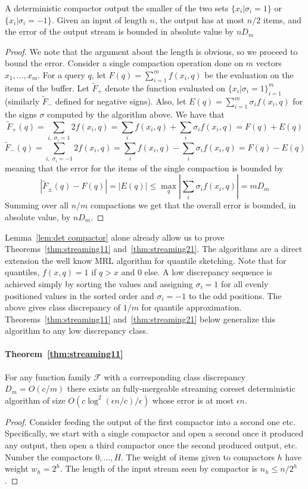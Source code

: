 \documentclass[12pt]{colt2019} %
\newcommand{\eps}{\epsilon}
\newcommand{\F}{\mathcal{F}}
\begin{document}
{\begin{lemma} \label{lem:det compactor}
A deterministic compactor output the smaller of the two sets  $\{ x_i | \sigma_i = 1\}$ or  $\{ x_i | \sigma_i = -1\}$. Given an input of length $n$, the output has at most $n/2$ items, and the error of the output stream is bounded in absolute value by $nD_m$
\end{lemma}
\begin{proof}
We note that the argument about the length is obvious, so we proceed to bound the error. Consider a single compaction operation done on $m$ vectors $x_1,\ldots,x_m$. For a query $q$, let $F(q)=\sum_{i=1}^m f(x_i,q)$ be the evaluation on the items of the buffer. Let $\tilde F_{+}$ denote the function evaluated on $\{ x_i | \sigma_i = 1\}_{i=1}^m$ (similarly $\tilde F_{-}$ defined for negative signs). Also, let $E(q) = \sum_{i=1}^m \sigma_i f(x_i,q)$ for the signs $\sigma$ computed by the algorithm above. We have that 
$$\tilde F_{+}(q) = \sum_{i ,\; \sigma_i=1} 2f(x_i, q) = \sum_{i} f(x_i, q) +  \sum_{i} \sigma_i f(x_i, q) = F(q) + E(q)$$
$$\tilde F_{-}(q) = \sum_{i ,\; \sigma_i=-1} 2f(x_i, q) = \sum_{i} f(x_i, q) - \sum_{i} \sigma_i f(x_i, q) = F(q) - E(q)$$
meaning that the error for the items of the single compaction is bounded by
$$|\tilde F_{\pm}(q) - F(q)| = |E(q)| \le \max_q |\sum_i \sigma_i f(x_i,q)| = mD_m$$
Summing over all $n/m$ compactions we get that the overall error is bounded, in absolute value, by $nD_m$.
\end{proof}

Lemma~\ref{lem:det compactor} alone already allow us to prove Theorems~\ref{thm:streaming11} and~\ref{thm:streaming21}. 
The algorithms are a direct extension the well know MRL algorithm \cite{MRL} for quantile sketching. 
Note that for quantiles, $f(x,q) = 1$ if $q > x$ and $0$ else. 
A low discrepancy sequence is achieved simply by sorting the values and assigning $\sigma_i = 1$ for all evenly positioned values in the sorted order and $\sigma_i=-1$ to the odd positions. The above gives class discrepancy of $1/m$ for quantile approximation.
Theorems~\ref{thm:streaming11} and~\ref{thm:streaming21} below generalize this algorithm to any low discrepancy class.

\paragraph{Theorem~\ref{thm:streaming11}}
For any function family $\F$ with a corresponding class discrepancy $D_m = O(c/m)$ there exists an fully-mergeable streaming coreset deterministic algorithm of size $O\left(c\log^2(\eps n/c)/\eps\right)$ whose error is at most $\eps n$.
\begin{proof}
Consider feeding the output of the first compactor into a second one etc. Specifically, we start with a single compactor and open a second once it produced any output, then open a third compactor once the second produced output, etc.
Number the compactors $0,\ldots,H$. The weight of items given to compactors $h$ have weight $w_h = 2^h$. The length of the input stream seen by compactor is $n_h \le n/2^h$.


\end{proof}}
\end{document}
